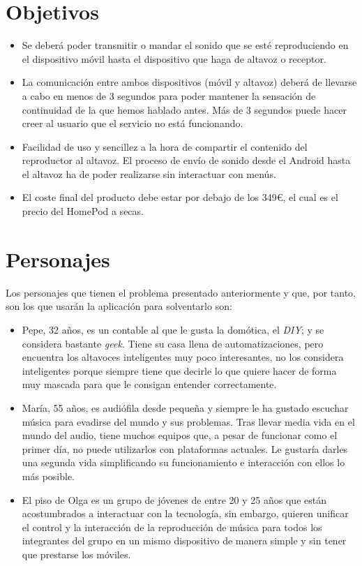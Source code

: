\section{Objetivos}
\begin{itemize}
    \item Se deberá poder transmitir o mandar el sonido que se esté
    reproduciendo en el dispositivo móvil hasta el dispositivo que haga de
    altavoz o receptor.
    \item La comunicación entre ambos dispositivos (móvil y altavoz) deberá de
    llevarse a cabo en menos de 3 segundos para poder mantener la sensación de
    continuidad de la que hemos hablado antes. Más de 3 segundos puede hacer
    creer al usuario que el servicio no está funcionando.
    \item Facilidad de uso y sencillez a la hora de compartir el contenido del
    reproductor al altavoz. El proceso de envío de sonido desde el Android hasta
    el altavoz ha de poder realizarse sin interactuar con menús.
    \item El coste final del producto debe estar por debajo de los 349€, el cual
    es el precio del HomePod a secas.
\end{itemize}

\section{Personajes}
Los personajes que tienen el problema presentado anteriormente y que, por tanto,
son los que usarán la aplicación para solventarlo son:
\begin{itemize}
    \item Pepe, 32 años, es un contable al que le gusta la domótica, el
    \emph{DIY}; y se considera bastante \emph{geek}. Tiene su casa llena de
    automatizaciones, pero encuentra los altavoces inteligentes muy poco
    interesantes, no los considera inteligentes porque siempre tiene que decirle
    lo que quiere hacer de forma muy mascada para que le consigan entender
    correctamente. 
    \item María, 55 años, es audiófila desde pequeña y siempre le ha gustado
    escuchar música para evadirse del mundo y sus problemas. Tras llevar media
    vida en el mundo del audio, tiene muchos equipos que, a pesar de funcionar
    como el primer día, no puede utilizarlos con plataformas actuales. Le gustaría
    darles una segunda vida simplificando su funcionamiento e interacción con
    ellos lo más posible. 
    \item El piso de Olga es un grupo de jóvenes de entre 20 y 25 años que están
    acostumbrados a interactuar con la tecnología, sin embargo, quieren unificar el control y la
    interacción de la reproducción de música para todos los integrantes del
    grupo en un mismo dispositivo de manera simple y sin tener que prestarse los
    móviles.
\end{itemize}

